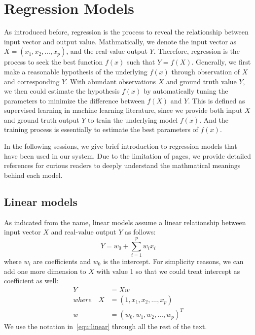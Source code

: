 \section{Regression Models}
\label{sec:method}
As introduced before, regression is the process to reveal the relationship between input vector and output value.
Mathmatically, we denote the input vector as $X = (x_1, x_2, \ldots, x_p)$, and the real-value output $Y$.
Therefore, regression is the process to seek the best function $f(x)$ such that $Y = f(X)$.
Generally, we first make a reasonable hypothesis of the underlying $f(x)$ through observation of $X$ and corresponding $Y$.
With abundant observations $X$ and ground truth value $Y$, we then could estimate the hypothesis $f(x)$ by automatically tuning the parameters to minimize the difference between $f(X)$ and $Y$.
This is defined as supervised learning in machine learning literature, since we provide both input $X$ and ground truth output $Y$ to train the underlying model $f(x)$.
And the training process is essentially to estimate the best parameters of $f(x)$.

In the following sessions, we give brief introduction to regression models that have been used in our system.
Due to the limitation of pages, we provide detailed references for curious readers to deeply understand the mathmatical meanings behind each model.

\subsection{Linear models}
\label{sub:linear_models}
As indicated from the name, linear models assume a linear relationship between input vector $X$ and real-value output $Y$ as follows:
\begin{equation}
	Y = w_0 + \sum\limits_{i=1}^p w_i{x_i}
\end{equation}
where $w_i$ are coefficients and $w_0$ is the intercept. For simplicity reasons, we can add one more dimension to $X$ with value 1 so that we could treat intercept as coefficient as well:
\begin{equation}
	\label{equ:linear}
	\begin{aligned}
		Y &= Xw \\
		where \quad X &= (1, x_1, x_2, \ldots, x_p) \\
		w &= {(w_0, w_1, w_2, \ldots, w_p)}^T
	\end{aligned}
\end{equation}
We use the notation in~\ref{equ:linear} through all the rest of the text.

